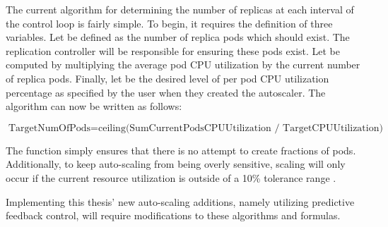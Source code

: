 The current algorithm for determining the number of replicas at each interval
of the control loop is fairly simple.
To begin, it requires the definition of
three variables. Let  be defined as the number of
replica pods which should exist. The replication controller will be responsible
for ensuring these pods exist. Let  be
computed by multiplying the average pod CPU utilization by the current number of
replica pods. Finally, let  be the desired level of
per pod CPU utilization percentage as specified by the user when they created
the autoscaler. The algorithm can now be written as follows:

\[ \mbox{TargetNumOfPods} = \mbox{ceiling(SumCurrentPodsCPUUtilization /
TargetCPUUtilization)} \]

The  function simply ensures that there is no attempt to create
fractions of pods. Additionally, to keep auto-scaling from being overly
sensitive, scaling will only occur if the current resource utilization is
outside of a 10\% tolerance range \cite{k8s-horizontal-pod-autoscaler-proposal}.

Implementing this thesis' new auto-scaling additions, namely utilizing
predictive feedback control, will require modifications to these algorithms and
formulas.
